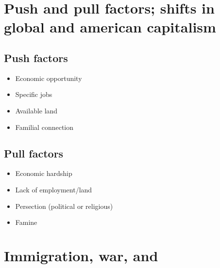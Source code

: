 \documentclass[12pt]{book}
\begin{document}
\section{Push and pull factors; shifts in global and american capitalism}

\subsection{Push factors}
\begin{itemize}
  \item Economic opportunity
  \item Specific jobs
  \item Available land
  \item Familial connection
\end{itemize}

\subsection{Pull factors}

\begin{itemize}
  \item Economic hardship
  \item Lack of employment/land
  \item Persection (political or religious)
  \item Famine
\end{itemize}

\section{Immigration, war, and}
\end{document}
